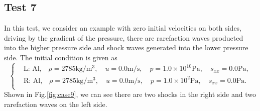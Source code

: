 \documentclass{article}
\numberwithin{equation}{section}
\numberwithin{table}{section}
\begin{document}
\subsection{Test 7}
In this test, we consider an example with zero initial velocities on both sides, driving by the gradient of the pressure, there are rarefaction waves producted into the higher pressure side and shock waves generated into the lower pressure side. The initial condition is given as
\begin{equation}
 \left\{ \begin{aligned}
	 &	 \text{L: Al,}\quad  \rho = 2785 \text{kg}/\text{m}^3, \quad  u = 0.0\text{m}/\text{s}, \quad  p = 1.0\times 10^{10} \text{Pa}, \quad s_{xx}= 0.0 \text{Pa},\\
	 &	 \text{R: Al,}\quad  \rho = 2785 \text{kg}/\text{m}^3, \quad  u = 0.0\text{m}/\text{s}, \quad  p = 1.0 \times 10^2 \text{Pa}, \quad  s_{xx}=0.0\text{Pa}.\\
   \end{aligned}
 \right.
\end{equation}
Shown in Fig.\ref{fig:case9}, we can see there are two shocks in the right side and two rarefaction waves on the left side.
\end{document}
